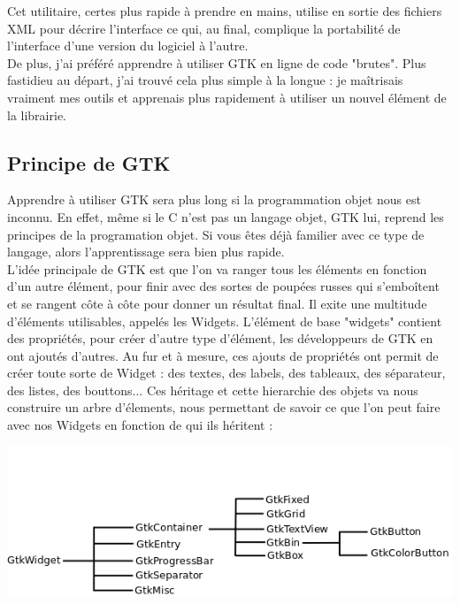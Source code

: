 \documentclass[11pt,french,a4paper]{report}
\begin{document}
Cet utilitaire, certes plus rapide à prendre en mains, utilise en sortie des fichiers XML pour décrire l'interface ce qui, 
au final, complique la portabilité de l'interface d'une version du logiciel à l'autre. \\ 
De plus, j'ai préféré apprendre à utiliser GTK en ligne de code "brutes". Plus fastidieu au départ, 
j'ai trouvé cela plus simple à la longue : je maîtrisais vraiment mes outils et apprenais plus rapidement à utiliser 
un nouvel élément de la librairie.  

        \subsection{Principe de GTK}
Apprendre à utiliser GTK sera plus long si la programmation objet nous est inconnu. En effet, même si le C n'est pas un langage objet,
GTK lui, reprend les principes de la programation objet. Si vous êtes déjà familier avec ce type de langage, alors l'apprentissage
sera bien plus rapide.\\
L'idée principale de GTK est que l'on va ranger tous les éléments en fonction d'un autre élément, pour finir avec des sortes de poupées 
russes qui s'emboîtent et se rangent côte à côte pour donner un résultat final. Il exite une multitude d'éléments utilisables, 
appelés les Widgets. L'élément de base "widgets" contient des propriétés, pour créer d'autre type d'élément, les développeurs de GTK 
en ont ajoutés d'autres. 
Au fur et à mesure, ces ajouts de propriétés ont permit de créer toute sorte de Widget : des textes, des labels, des tableaux, 
des séparateur, des listes, des bouttons... 
Ces héritage et cette hierarchie des objets va nous construire un arbre d'élements, nous permettant de savoir ce que l'on peut 
faire avec nos Widgets en fonction de qui ils héritent : 
\begin{center}
\includegraphics[scale=0.7]{../images/dia/arbo_widget.png} \\
\end{center}
\end{document}
